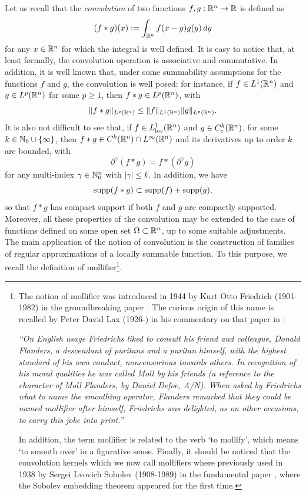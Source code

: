 Let us recall that the {\em convolution} of two functions $f, g : \mathbb{R}^{n} \to \mathbb{R}$ is defined as 
\begin{equation*}
(f \ast g)(x) := \int_{\mathbb{R}^{n}} f(x - y) g(y) \, dy
\end{equation*}
for any $x \in \mathbb{R}^{n}$ for which the integral is well defined. It is easy to notice that, at least formally, the convolution operation is associative and commutative. In addition, it is well known that, under some summability assumptions for the functions $f$ and $g$, the convolution is well posed: for instance, if $f \in L^{1}(\mathbb{R}^{n})$ and $g \in L^{p}(\mathbb{R}^n)$ for some $p \ge 1$, then $f \ast g \in L^{p}(\mathbb{R}^{n})$, with $$\|f \ast g\|_{L^{p}(\mathbb{R}^{n})} \le \|f\|_{L^{1}(\mathbb{R}^{n})}\|g\|_{L^{p}(\mathbb{R}^{n})}.$$ 
It is also not difficult to see that, if $f \in L^{1}_{\rm loc}(\mathbb{R}^{n})$ and $g \in C_{c}^{k}(\mathbb{R}^{n})$, for some $k \in \mathbb{N}_{0} \cup \{\infty\}$, then $f\ast g \in C^{k}(\mathbb{R}^{n}) \cap L^{\infty}(\mathbb{R}^{n})$ and its derivatives up to order $k$ are bounded, with
\begin{equation*}
\partial^{\gamma} (f \ast g) = f \ast (\partial^{\gamma} g)
\end{equation*}
for any multi-index $\gamma \in \mathbb{N}_{0}^{n}$ with $|\gamma|\le k$. In addition, we have
\begin{equation*}
\operatorname{supp}(f \ast g) \subset \operatorname{supp}(f) + \operatorname{supp}(g),
\end{equation*}
so that $f \ast g$ has compact support if both $f$ and $g$ are compactly supported. Moreover, all these properties of the convolution may be extended to the case of functions defined on some open set $\Omega \subset \mathbb{R}^{n}$, up to some suitable adjustments. 
The main application of the notion of convolution is the construction of families of regular approximations of a locally summable function. To this purpose, we recall the definition of mollifier\footnote{The notion of mollifier was introduced in 1944 by Kurt Otto Friedrich (1901-1982) in the groundbreaking paper \cite{MR9701}. The curious origin of this name is recalled by Peter David Lax (1926-) in his commentary on that paper in  \cite{MR897749}: 

{\em ``On English usage Friedrichs liked to consult his friend and colleague, Donald Flanders, a descendant of puritans and a puritan himself, with the highest standard of his own conduct, noncensorious towards others. In recognition of his moral qualities he was called Moll by his friends {\rm (a reference to the character of Moll Flanders, by Daniel Defoe, A/N)}. When asked by Friedrichs what to name the smoothing operator, Flanders remarked that they could be named mollifier after himself; Friedrichs was delighted, as on other occasions, to carry this joke into print.''}

In addition, the term mollifier is related to the verb `to mollify', which means `to smooth over' in a figurative sense. Finally, it should be noticed that the convolution kernels which we now call mollifiers where previously used in 1938 by Sergei Lvovich Sobolev (1908-1989) in the fundamental paper \cite{soboleff1938theoreme}, where the Sobolev embedding theorem appeared for the first time.}.

